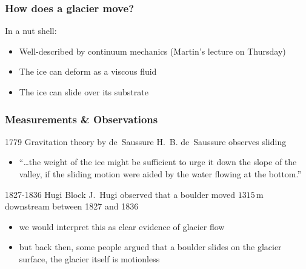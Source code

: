 \documentclass[hide notes,intlimits,unknownkeysallowed]{beamer}
\begin{document}
{
%
} 


\begin{frame}
  \frametitle{How does a glacier move?}
  \begin{block}{In a nut shell:}
    \begin{itemize}
    \item Well-described by continuum mechanics (Martin's lecture on Thursday)
    \item The ice can deform as a viscous fluid
    \item The ice can slide over its substrate
    \end{itemize}
  \end{block}
\end{frame}


\begin{frame}
  \frametitle{Measurements \& Observations}
    \begin{block}{1779 Gravitation theory by de~Saussure}
      H.~B. de~Saussure observes sliding
      \begin{itemize}
        \item ``\ldots the weight of the ice might be sufficient to urge it down the slope of the valley, if the sliding motion were aided by the water flowing at the bottom.''
      \end{itemize}
    \end{block}
    \begin{block}{1827-1836 Hugi Block}
      J.~Hugi observed that a boulder moved $1315\,\text{m}$ downstream between 1827 and 1836
      \begin{itemize}
        \item we would interpret this as clear evidence of glacier flow
        \item but back then, some people argued that a boulder slides on the glacier surface, the glacier itself is motionless
      \end{itemize}
    \end{block}
\end{frame}
\end{document}
